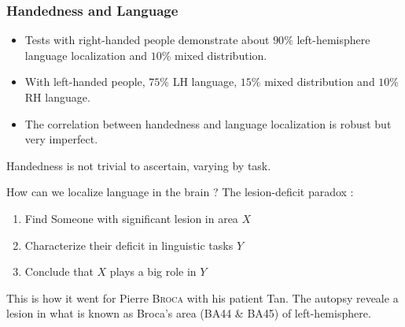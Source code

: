 \documentclass{cours}
\begin{document}
\subsubsection{Handedness and Language}
\begin{itemize}
    \item Tests with right-handed people demonstrate about $90\%$ left-hemisphere language localization and $10\%$ mixed distribution. 
    \item With left-handed people, $75\%$ LH language, $15\%$ mixed distribution and $10\%$ RH language.
    \item The correlation between handedness and language localization is robust but very imperfect.
\end{itemize}
Handedness is not trivial to ascertain, varying by task. 

How can we localize language in the brain ? 
The lesion-deficit paradox : 
\begin{enumerate}
    \item Find Someone with significant lesion in area $X$
    \item Characterize their deficit in linguistic tasks $Y$
    \item Conclude that $X$ plays a big role in $Y$
\end{enumerate}
This is how it went for Pierre \textsc{Broca} with his patient Tan. The autopsy reveale a lesion in what is known as Broca's area (BA44 \& BA45) of left-hemisphere.
\end{document}
